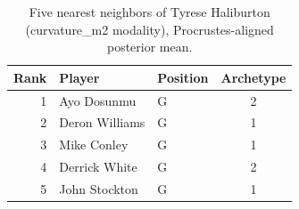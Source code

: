 \begin{table}[htbp]
  \centering\small
  \begin{tabular}{rllc}
    \toprule
    Rank & Player & Position & Archetype \\
    \midrule
    1 & Ayo Dosunmu & G & 2 \\
    2 & Deron Williams & G & 1 \\
    3 & Mike Conley & G & 1 \\
    4 & Derrick White & G & 2 \\
    5 & John Stockton & G & 1 \\
    \bottomrule
  \end{tabular}
  \caption{Five nearest neighbors of Tyrese Haliburton (curvature_m2 modality), Procrustes-aligned posterior mean.}
  \label{tab:Tyrese_Haliburton_neighbors_curvature_m2}
\end{table}

